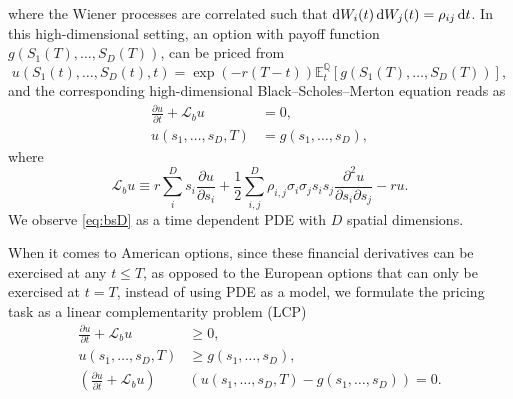 \documentclass{UUThesisTemplate}
\begin{document}
where the Wiener processes are correlated such that $\dif W_i(t)\dif W_j(t)=\rho_{ij}\dif t$. In this high-dimensional setting, an option with payoff function $g(S_1(T),\ldots,S_D(T))$, can be priced from 
\begin{equation}
\label{eq:mcD}
u(S_1(t),\ldots,S_D(t),t)=\exp\left(-r(T-t)\right)\mathbb{E}^{{{\mathbb{Q}}}}_{t}[g(S_1(T),\ldots,S_D(T))],
\end{equation}
and the corresponding high-dimensional Black--Scholes--Merton equation reads as
\begin{align}
\frac{\partial u}{\partial t}+\mathcal{L}_b u&=0, \nonumber \\
u(s_1,\ldots,s_D,T)&=g(s_1,\ldots,s_D), \label{eq:bsD}
\end{align}
where
\begin{equation}
\label{eqBSop}
\mathcal{L}_b u \equiv r\sum\limits_{i}^{D}s_i\frac{\partial u}{\partial{s_i}}+\frac{1}{2}\sum\limits_{i,j}^{D}\rho_{i,j}\sigma_i\sigma_j s_is_j\frac{\partial^2u}{\partial s_i \partial s_j}-ru.
\end{equation}
We observe \eqref{eq:bsD} as a time dependent PDE with $D$ spatial dimensions.
\par When it comes to American options, since these financial derivatives can be exercised at any $t \leq T$, as opposed to the European options that can only be exercised at $t=T$, instead of using PDE as a model, we formulate the pricing task as a linear complementarity problem (LCP)
\begin{align}
\frac{\partial u}{\partial t}+\mathcal{L}_b u&\geq 0,\nonumber \\
u(s_1,\ldots, s_D,T)&\geq g(s_1,\ldots, s_D), \nonumber \\
\left( \frac{\partial u}{\partial t}+\mathcal{L}_b u\right)& \left(u(s_1,\ldots, s_D,T)-g(s_1,\ldots, s_D)\right)=0. \label{eqlcp}
\end{align}
%
\end{document}

